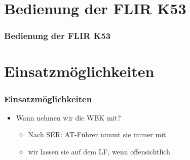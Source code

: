 \documentclass[aspectratio=169]{beamer}
\begin{document}

    \section{Bedienung der FLIR K53}
    \begin{frame}
    \frametitle{Bedienung der FLIR K53}
    \end{frame}

    \section{Einsatzmöglichkeiten}
    \begin{frame}[t]
    \frametitle{Einsatzmöglichkeiten}
    \begin{itemize}
    \item Wann nehmen wir die WBK mit?
    \begin{itemize}
    \item<2-> Nach SER: AT-Führer nimmt sie immer mit.
        \item<3-> wir lassen sie auf dem LF, wenn offensichtlich
            \end{itemize}
            \end{itemize}
            \end{frame}
            \begin{frame}
            \end{frame}
\end{document}
